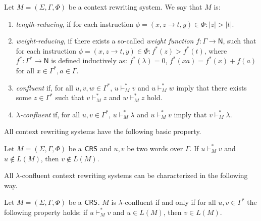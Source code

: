 \begin{definition}\label{definition:crs-types}
Let  $M = (\Sigma, \Gamma, \Phi)$ be a context rewriting system. We say that $M$ is:
\begin{enumerate}
\item \emph{length-reducing}, if for each instruction $\phi = (x, z \to t, y) \in \Phi: |z| > |t|$.

\item \emph{weight-reducing}, if there exists a so-called \emph{weight function} $f: \Gamma \to \mathsf{N}$, such that for each instruction $\phi = (x, z \to t, y) \in \Phi: f^*(z) > f^*(t)$, where $f^*: \Gamma^* \to \mathsf{N}$ is defined inductively as: $f^*(\lambda) = 0$, $f^*(xa) = f^*(x) + f(a)$ for all $x \in \Gamma^*, a \in \Gamma$.

\item \emph{confluent} if, for all $u, v, w \in \Gamma^*$, $u \vdash_M^* v$ and $u \vdash_M^* w$ imply that there exists some $z \in \Gamma^*$ such that $v \vdash_M^* z$ and $w \vdash_M^* z$ hold.

\item \emph{$\lambda$-confluent} if, for all $u, v \in \Gamma^*$, $u \vdash_M^* \lambda$ and $u \vdash_M^* v$ imply that $v \vdash_M^* \lambda$.

\end{enumerate}
\end{definition}

All context rewriting systems have the following basic property.

\begin{lemma}\label{lemma:error-preserving}
Let $M=(\Sigma, \Gamma, \Phi)$ be a $\textup{\sf CRS\/}$ and $u, v$ be two words over $\Gamma$. 
If $u \vdash_M^* v$ and $u \not\in L(M)$, then $v \not\in L(M)$.
\end{lemma}

All $\lambda$-confluent context rewriting systems can be characterized in the following way.

\begin{lemma}\label{lemma:correctness-preserving}
Let $M=(\Sigma, \Gamma, \Phi)$ be a $\textup{\sf CRS\/}$. $M$ is $\lambda$-confluent if and only if for all $u, v \in \Gamma^*$ the following property holds: if $u \vdash_M^* v$ and $u \in L(M)$, then $v \in L(M)$.
\end{lemma}

